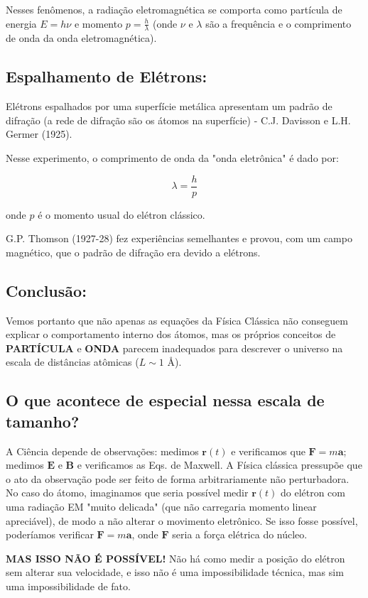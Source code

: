 Nesses fenômenos, a radiação eletromagnética se comporta como partícula de energia $E = h\nu$ e momento $p = \frac{h}{\lambda}$ (onde $\nu$ e $\lambda$ são a frequência e o comprimento de onda da onda eletromagnética).

\subsection*{Espalhamento de Elétrons:}
Elétrons espalhados por uma superfície metálica apresentam um padrão de difração (a rede de difração são os átomos na superfície) - C.J. Davisson e L.H. Germer (1925).

Nesse experimento, o comprimento de onda da "onda eletrônica" é dado por:

\begin{equation}
\lambda = \frac{h}{p}
\end{equation}

onde $p$ é o momento usual do elétron clássico.

G.P. Thomson (1927-28) fez experiências semelhantes e provou, com um campo magnético, que o padrão de difração era devido a elétrons.

\subsection*{Conclusão:}
Vemos portanto que não apenas as equações da Física Clássica não conseguem explicar o comportamento interno dos átomos, mas os próprios conceitos de \textbf{PARTÍCULA} e \textbf{ONDA} parecem inadequados para descrever o universo na escala de distâncias atômicas ($L \sim 1$ Å).

\subsection*{O que acontece de especial nessa escala de tamanho?}
A Ciência depende de observações: medimos ${\bm r}(t)$ e verificamos que ${\bm F} = m{\bm a}$; medimos ${\bm E}$ e ${\bm B}$ e verificamos as Eqs. de Maxwell. A Física clássica pressupõe que o ato da observação pode ser feito de forma arbitrariamente não perturbadora. No caso do átomo, imaginamos que seria possível medir ${\bm r}(t)$ do elétron com uma radiação EM "muito delicada" (que não carregaria momento linear apreciável), de modo a não alterar o movimento eletrônico. Se isso fosse possível, poderíamos verificar ${\bm F} = m{\bm a}$, onde ${\bm F}$ seria a força elétrica do núcleo.

\textbf{MAS ISSO NÃO É POSSÍVEL!} Não há como medir a posição do elétron sem alterar sua velocidade, e isso não é uma impossibilidade técnica, mas sim uma impossibilidade de fato.

